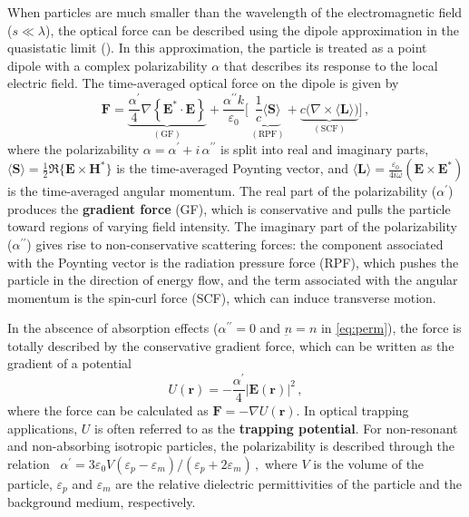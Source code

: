 When particles are much smaller than the wavelength of the electromagnetic field 
($s \ll \lambda$), the optical force can be described using the dipole approximation 
in the quasistatic limit (). In this approximation, the 
particle is treated as a point dipole with a complex polarizability $\alpha$ that 
describes its response to the local electric field. 
The time-averaged optical force on the dipole is given by~\cite{novotny}
\begin{equation}\label{eq:dip_force}
    \mathbf{F} = 
    \underbrace{\frac{\alpha^{\prime}}{4} \nabla\left\{ \mathbf{E}^* \cdot \mathbf{E} \right\}}_{(\text{GF})}
    + \frac{\alpha^{\prime\prime}k}{\varepsilon_0}
    \Big[\, \underbrace{\frac{1}{c} \langle \mathbf{S} \rangle}_{(\text{RPF})}
    + \underbrace{c \big( \nabla \times \langle \mathbf{L} \rangle \big)}_{(\text{SCF})} \Big]\,,
\end{equation}
where the polarizability $\alpha = \alpha^\prime + i\,\alpha^{\prime\prime}$ is split into 
real and imaginary parts, $\langle \mathbf{S} \rangle = \frac{1}{2} \Re\{\mathbf{E} \times 
\mathbf{H}^*\}$ is the time-averaged Poynting vector, and 
$\langle \mathbf{L} \rangle = \frac{\varepsilon_0}{4 i \omega} (\mathbf{E} \times \mathbf{E}^*)$ 
is the time-averaged angular momentum. The real part of the polarizability ($\alpha^\prime$) produces the 
\textbf{gradient force} (GF), which is conservative and pulls the particle toward regions 
of varying field intensity. The imaginary part of the polarizability ($\alpha^{\prime\prime}$) 
gives rise to non-conservative scattering forces: the component associated with the Poynting vector is 
the radiation pressure force (RPF), which pushes the particle in the direction of energy 
flow, and the term associated with the angular momentum is the spin-curl force (SCF), 
which can induce transverse motion. 

In the abscence of absorption effects ($\alpha^{\prime \prime}=0$ and $\underbar{n}=n$ in \eqref{eq:perm}), the force is totally described 
by the conservative gradient force, which can be written as the gradient 
of a potential
\begin{equation}
    U (\mathbf{r}) = -\frac{\alpha^{\prime}}{4} \left|\mathbf{E}(\mathbf{r})\right|^2\,,
\end{equation}
where the force can be calculated as $\mathbf{F} = -\nabla U(\mathbf{r})$. In optical trapping applications, $U$ is often referred to as the \textbf{trapping potential}.
For non-resonant and non-absorbing isotropic particles, the polarizability is 
described through the relation~\cite{BornWolf:1999:Book} 
    $\alpha^{\prime}= 3 \varepsilon_0 V (\varepsilon_p-\varepsilon_m)/(\varepsilon_p+2 \varepsilon_m)\,,$
where $V$ is the volume of the particle, $\varepsilon_p$ and $\varepsilon_m$ are the relative
dielectric permittivities of the particle and the background medium, respectively. 

